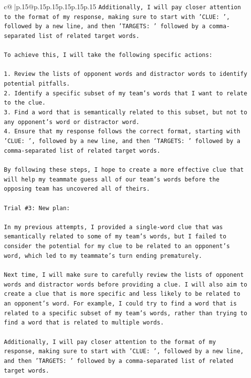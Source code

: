 \documentclass{article}
\begin{document}
{\begin{supertabular}{c@{$\;$}|p{.15\linewidth}@{}p{.15\linewidth}p{.15\linewidth}p{.15\linewidth}p{.15\linewidth}p{.15\linewidth}}
{{{\texttt{Additionally, I will pay closer attention to the format of my response, making sure to start with 'CLUE: ', followed by a new line, and then 'TARGETS: ' followed by a comma{-}separated list of related target words.} \\
\\ 
\texttt{To achieve this, I will take the following specific actions:} \\
\\ 
\texttt{1. Review the lists of opponent words and distractor words to identify potential pitfalls.} \\
\texttt{2. Identify a specific subset of my team's words that I want to relate to the clue.} \\
\texttt{3. Find a word that is semantically related to this subset, but not to any opponent's word or distractor word.} \\
\texttt{4. Ensure that my response follows the correct format, starting with 'CLUE: ', followed by a new line, and then 'TARGETS: ' followed by a comma{-}separated list of related target words.} \\
\\ 
\texttt{By following these steps, I hope to create a more effective clue that will help my teammate guess all of our team's words before the opposing team has uncovered all of theirs.} \\
\\ 
\texttt{Trial \#3: New plan: } \\
\\ 
\texttt{In my previous attempts, I provided a single{-}word clue that was semantically related to some of my team's words, but I failed to consider the potential for my clue to be related to an opponent's word, which led to my teammate's turn ending prematurely. } \\
\\ 
\texttt{Next time, I will make sure to carefully review the lists of opponent words and distractor words before providing a clue. I will also aim to create a clue that is more specific and less likely to be related to an opponent's word. For example, I could try to find a word that is related to a specific subset of my team's words, rather than trying to find a word that is related to multiple words. } \\
\\ 
\texttt{Additionally, I will pay closer attention to the format of my response, making sure to start with 'CLUE: ', followed by a new line, and then 'TARGETS: ' followed by a comma{-}separated list of related target words.} \\
}}}
\end{supertabular}}
\end{document}
